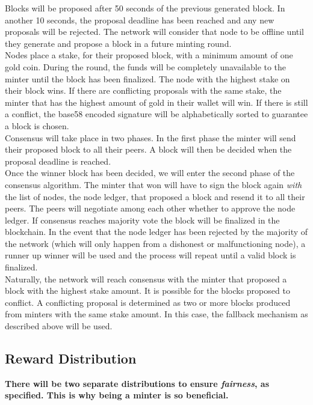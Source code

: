 \documentclass[12pt,a4paper]{article}
\begin{document}
  Blocks will be proposed after 50 seconds of the previous generated block. In
  another 10 seconds, the proposal deadline has been reached and any new
  proposals will be rejected. The network will consider that node to be offline
  until they generate and propose a block in a future minting round.\\

  Nodes place a stake, for their proposed block, with a minimum amount of one
  gold coin. During the round, the funds will be completely unavailable to the
  minter until the block has been finalized. The node with the highest stake on
  their block wins. If there are conflicting proposals with the same stake, the
  minter that has the highest amount of gold in their wallet will win. If there
  is still a conflict, the base58\cite{base58} encoded signature will be
  alphabetically sorted to guarantee a block is chosen.\\

  Consensus will take place in two phases. In the first phase the minter will
  send their proposed block to all their peers. A block will then be decided
  when the proposal deadline is reached.\\

  Once the winner block has been decided, we will enter the second phase of the
  consensus algorithm. The minter that won will have to sign the block again
  \textit{with} the list of nodes, the node ledger, that proposed a block and
  resend it to all their peers. The peers will negotiate among each other
  whether to approve the node ledger. If consensus reaches majority vote the
  block will be finalized in the blockchain. In the event that the node ledger
  has been rejected by the majority of the network (which will only happen from
  a dishonest or malfunctioning node), a runner up winner will be used and the
  process will repeat until a valid block is finalized.\\

  Naturally, the network will reach consensus with the minter that proposed a
  block with the highest stake amount. It is possible for the blocks proposed to
  conflict. A conflicting proposal is determined as two or more blocks produced
  from minters with the same stake amount. In this case, the fallback mechanism
  as described above will be used.

  \subsection{Reward Distribution}
  \textbf{There will be two separate distributions to ensure \textit{fairness},
  as specified. This is why being a minter is so beneficial.}\\
\end{document}
